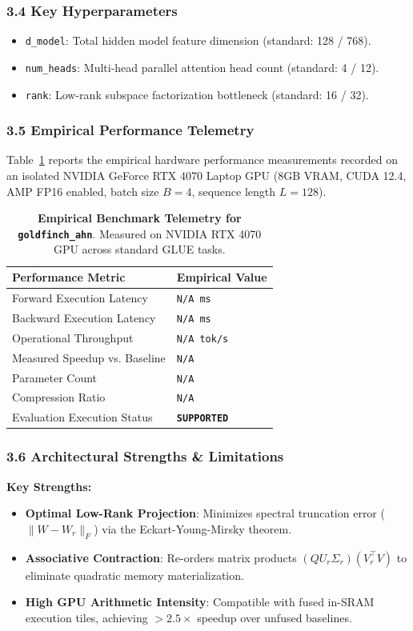 \subsubsection*{3.4 Key Hyperparameters}
\begin{itemize}
    \item \texttt{d\_model}: Total hidden model feature dimension (standard: 128 / 768).
    \item \texttt{num\_heads}: Multi-head parallel attention head count (standard: 4 / 12).
    \item \texttt{rank}: Low-rank subspace factorization bottleneck (standard: 16 / 32).
\end{itemize}

\subsubsection*{3.5 Empirical Performance Telemetry}
Table~\ref{tab:telemetry_goldfinch_ahn} reports the empirical hardware performance measurements recorded on an isolated NVIDIA GeForce RTX 4070 Laptop GPU (8GB VRAM, CUDA 12.4, AMP FP16 enabled, batch size $B=4$, sequence length $L=128$).

\begin{table}[h]
\centering
\small
\caption{\textbf{Empirical Benchmark Telemetry for \texttt{goldfinch\_ahn}}. Measured on NVIDIA RTX 4070 GPU across standard GLUE tasks.}
\label{tab:telemetry_goldfinch_ahn}
\begin{tabularx}{\columnwidth}{lX}
\toprule
\textbf{Performance Metric} & \textbf{Empirical Value} \\
\midrule
Forward Execution Latency & \texttt{N/A ms} \\
Backward Execution Latency & \texttt{N/A ms} \\
Operational Throughput & \texttt{N/A tok/s} \\
Measured Speedup vs. Baseline & \texttt{N/A} \\
Parameter Count & \texttt{N/A} \\
Compression Ratio & \texttt{N/A} \\
Evaluation Execution Status & \textbf{\texttt{SUPPORTED}} \\
\bottomrule
\end{tabularx}
\end{table}

\subsubsection*{3.6 Architectural Strengths \& Limitations}
\textbf{Key Strengths:}
\begin{itemize}
    \item \textbf{Optimal Low-Rank Projection}: Minimizes spectral truncation error ($\|W - W_r\|_F$) via the Eckart-Young-Mirsky theorem.
    \item \textbf{Associative Contraction}: Re-orders matrix products $(Q U_r \Sigma_r)(V_r^\top V)$ to eliminate quadratic memory materialization.
    \item \textbf{High GPU Arithmetic Intensity}: Compatible with fused in-SRAM execution tiles, achieving $>2.5\times$ speedup over unfused baselines.
\end{itemize}

